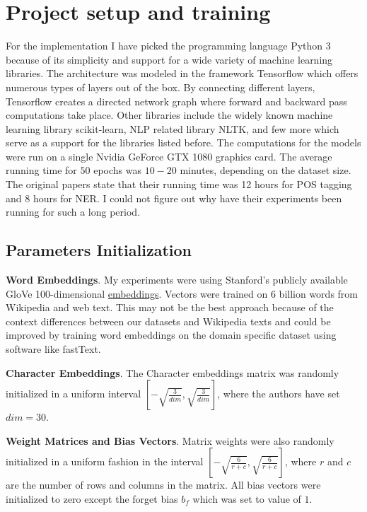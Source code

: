 \section{Project setup and training}
For the implementation I have picked the programming language
Python 3\cite{python} because of its simplicity and support for a wide variety of
machine learning libraries. The architecture was modeled in the framework
Tensorflow which offers numerous types of layers out of the box. By connecting
different layers, Tensorflow creates a directed network graph where forward
and backward pass computations take place. Other libraries include the widely known
machine learning library scikit-learn\cite{scikit}, NLP related library
NLTK\cite{nltk}, and few more which serve as a support for the libraries
listed before. The computations for the models were run on a single Nvidia GeForce
GTX 1080 graphics card. The average running time for $50$ epochs was $10
- 20$ minutes, depending on the dataset size. The original papers state that
their running time was 12 hours for POS tagging and 8 hours for NER. I could
not figure out why have their experiments been running for such a long period.

\subsection{Parameters Initialization}
\textbf{Word Embeddings}. My experiments were using Stanford's publicly
available GloVe 100-dimensional
\href{http://nlp.stanford.edu/projects/glove/}{embeddings}. Vectors were
trained on 6 billion words from Wikipedia and web text\cite{glvoe100}. This may
not be the best approach because of the context differences between our
datasets and Wikipedia texts and could be improved by training word embeddings
on the domain specific dataset using software like fastText\cite{fastText}.

\textbf{Character Embeddings}. The Character embeddings matrix was randomly initialized
in a uniform interval $\left[-\sqrt{\frac{3}{dim}},
\sqrt{\frac{3}{dim}}\right]$, where the authors have set $dim = 30$.

\textbf{Weight Matrices and Bias Vectors}. Matrix weights were also randomly
initialized in a uniform fashion in the interval $\left[-\sqrt{\frac{6}{r+c}},
\sqrt{\frac{6}{r+c}}\right]$, where $r$ and $c$ are the number of rows and
columns in the matrix\cite{initialization}. All bias vectors were initialized
to zero except the forget bias $b_f$ which was set to value of $1$. 

